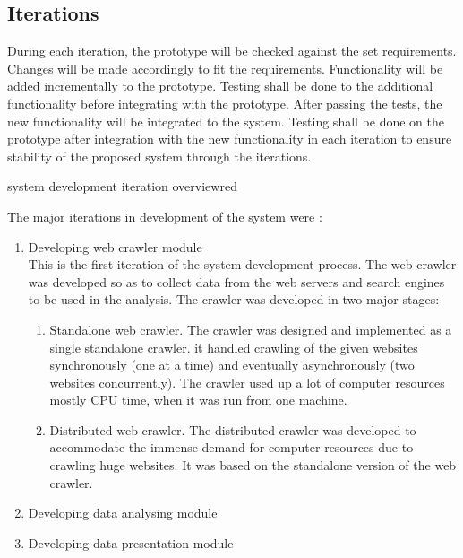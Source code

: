 \subsection{Iterations}
During each iteration, the prototype will be checked against the set requirements. Changes will be made accordingly to fit the requirements.
Functionality will be added incrementally to the prototype. Testing shall be done to the additional functionality before integrating with the prototype. After passing the tests, the new functionality will
be integrated to the system.
Testing shall be done on the prototype after integration with the new functionality in each iteration to ensure stability of the proposed system through the iterations.

\begin{review_comment}{system development iteration overview}{red}{}
\end{review_comment}
The major iterations in development of the system were :
\begin{enumerate}
\item Developing web crawler module\\
This is the first iteration of the system development process. The web crawler was developed so as
to collect data from the web servers and search engines to be used in the analysis. The crawler was
developed in two major stages:
\begin{enumerate}
\item Standalone web crawler.
The crawler was designed and implemented as a single standalone crawler. it handled crawling of
the given websites synchronously (one at a time) and eventually asynchronously (two websites concurrently). The crawler used up a lot of computer resources mostly CPU time, when it was run from one machine.
\item Distributed web crawler. 
The distributed crawler was developed to accommodate the immense demand for computer resources due to crawling huge websites. It was based on the standalone version of the web crawler.
\end{enumerate}
\item Developing data analysing module\\
\item Developing data presentation module\\
\end{enumerate}


